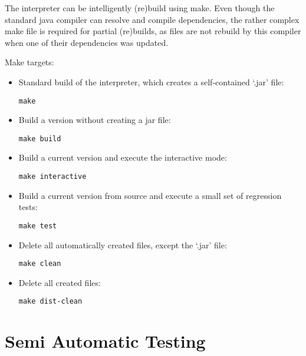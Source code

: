 The interpreter can be intelligently (re)build using make.
Even though the standard java compiler can resolve and compile dependencies, the rather complex make file is required for partial (re)builds, as files are not rebuild by this compiler when one of their dependencies was updated.

Make targets:

\begin{itemize}
	\item Standard build of the interpreter, which creates a self-contained `.jar' file:
\begin{lstlisting}[frame=none,numbers=none]
make
\end{lstlisting}

	\item Build a version without creating a jar file:

\begin{lstlisting}[frame=none,numbers=none]
make build
\end{lstlisting}

	\item Build a current version and execute the interactive mode:

\begin{lstlisting}[frame=none,numbers=none]
make interactive
\end{lstlisting}

	\item Build a current version from source and execute a small set of regression tests:

\begin{lstlisting}[frame=none,numbers=none]
make test
\end{lstlisting}

	\item Delete all automatically created files, except the `.jar' file:

\begin{lstlisting}[frame=none,numbers=none]
make clean
\end{lstlisting}

	\item Delete all created files:

\begin{lstlisting}[frame=none,numbers=none]
make dist-clean
\end{lstlisting}

\end{itemize}

\section{Semi Automatic Testing}\label{testing}

